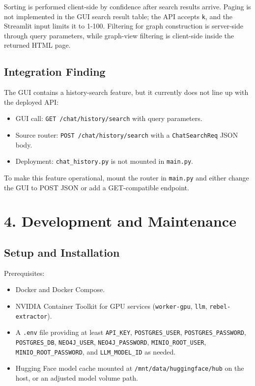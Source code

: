 \documentclass[10pt,letterpaper]{article}
\begin{document}
Sorting is performed client-side by confidence after search results arrive. Paging is not implemented in the GUI search result table; the API accepts \texttt{k}, and the Streamlit input limits it to 1-100. Filtering for graph construction is server-side through query parameters, while graph-view filtering is client-side inside the returned HTML page.

\subsection{Integration Finding}

The GUI contains a history-search feature, but it currently does not line up with the deployed API:

\begin{itemize}
\item GUI call: \texttt{GET /chat/history/search} with query parameters.
\item Source router: \texttt{POST /chat/history/search} with a \texttt{ChatSearchReq} JSON body.
\item Deployment: \texttt{chat\_history.py} is not mounted in \texttt{main.py}.
\end{itemize}

To make this feature operational, mount the router in \texttt{main.py} and either change the GUI to POST JSON or add a GET-compatible endpoint.

\section{4. Development and Maintenance}

\subsection{Setup and Installation}

Prerequisites:

\begin{itemize}
\item Docker and Docker Compose.
\item NVIDIA Container Toolkit for GPU services (\texttt{worker-gpu}, \texttt{llm}, \texttt{rebel-extractor}).
\item A \texttt{.env} file providing at least \texttt{API\_KEY}, \texttt{POSTGRES\_USER}, \texttt{POSTGRES\_PASSWORD}, \texttt{POSTGRES\_DB}, \texttt{NEO4J\_USER}, \texttt{NEO4J\_PASSWORD}, \texttt{MINIO\_ROOT\_USER}, \texttt{MINIO\_ROOT\_PASSWORD}, and \texttt{LLM\_MODEL\_ID} as needed.
\item Hugging Face model cache mounted at \texttt{/mnt/data/huggingface/hub} on the host, or an adjusted model volume path.
\end{itemize}
\end{document}
